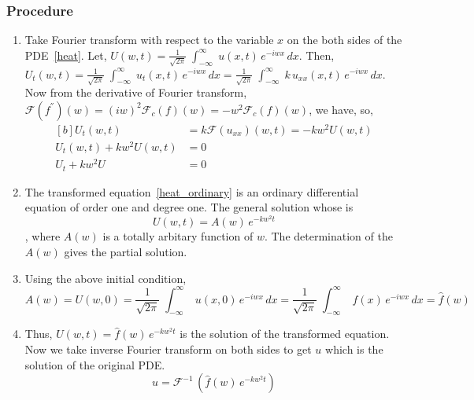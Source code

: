 \documentclass[aima331_lecturenotes_ku.tex]{subfiles}
\begin{document}
 \subsubsection{Procedure}
 \begin{enumerate}
 \item Take Fourier transform with respect to the variable $x$ on the both sides of the PDE~\ref{heat}.
   Let, $\displaystyle U(w,t) = \frac{1}{\sqrt{2\pi}} \; \int_{-\infty}^{\infty} \; u(x,t)\, e^{-iwx}\,dx$. Then, \\[3mm]
   $\displaystyle U_t(w,t) = \frac{1}{\sqrt{2\pi}} \; \int_{-\infty}^{\infty} \; u_t(x,t)\, e^{-iwx}\,dx = \frac{1}{\sqrt{2\pi}} \; \int_{-\infty}^{\infty} \;k\, u_{xx}(x,t)\, e^{-iwx}\,dx$. \\[2mm]
   Now from the derivative of Fourier transform, $\mathcal{F}(f^{''})(w)=(iw)^2\mathcal{F}_c(f)(w)=-w^2\mathcal{F}_c(f)(w)$, we have, so,
   \begin{equation}
     \label{heat_ordinary}
     \begin{aligned}[b]
       U_t(w,t) &= k \mathcal{F}(u_{xx})(w,t) = -kw^2U(w,t) \\[2mm]
       U_t(w,t) + kw^2U(w,t) &=0 \\[2mm]
       U_t + kw^2U &=0
     \end{aligned}
   \end{equation}

 \item The transformed equation~\ref{heat_ordinary} is an ordinary differential equation of order one and degree one. The general solution whose is $$ U(w,t) = A(w) \,e^{-kw^2t} $$,
   where $A(w)$ is a totally arbitary function of $w$. The determination of the $A(w)$ gives the partial solution.

 \item Using the above initial condition,
   $$A(w)=U(w,0)=\frac{1}{\sqrt{2\pi}} \; \int_{-\infty}^{\infty} \; u(x,0)\, e^{-iwx}\,dx= \frac{1}{\sqrt{2\pi}} \; \int_{-\infty}^{\infty} \; f(x)\, e^{-iwx}\,dx = \hat{f}(w)$$

 \item Thus, $U(w,t) = \hat{f}(w)\, e^{-kw^2t}$ is the solution of the transformed equation. Now we take inverse Fourier transform on both sides to get $u$ which is the solution of the original PDE.
   $$u = \mathcal{F}^{-1}\,(\hat{f}(w)\, e^{-kw^2t})$$

 \end{enumerate}
\end{document}
